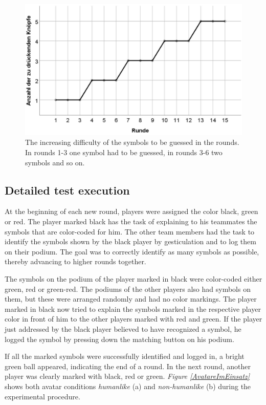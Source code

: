\documentclass[sigchi]{acmart}
\begin{document}
\begin{figure}[H]
		\begin{footnotesize}
		\centering
			\includegraphics[width=0.7\linewidth]{Abbildungen/RoundDifficulty.JPG}	
			\caption[The difficulty of the rounds]{The increasing difficulty of the symbols to be guessed in the rounds. In rounds 1-3 one symbol had to be guessed, in rounds 3-6 two symbols and so on.}
			\label{RoundDifficulty}
		\end{footnotesize}
	\end{figure}

\subsection{Detailed test execution}
At the beginning of each new round, players were assigned the color black, green or red.
The player marked black has the task of explaining to his teammates the symbols that are color-coded for him. The other team members had the task to identify the symbols shown by the black player by gesticulation and to log them on their podium. The goal was to correctly identify as many symbols as possible, thereby advancing to higher rounds together.

The symbols on the podium of the player marked in black were color-coded either green, red or green-red. The podiums of the other players also had symbols on them, but these were arranged randomly and had no color markings. The player marked in black now tried to explain the symbols marked in the respective player color in front of him to the other players marked with red and green. If the player just addressed by the black player believed to have recognized a symbol, he logged the symbol by pressing down the matching button on his podium. 

If all the marked symbols were successfully identified and logged in, a bright green ball appeared, indicating the end of a round.
In the next round, another player was clearly marked with black, red or green.
\textit{Figure \ref{AvatareImEinsatz}} shows both avatar conditions \textit{humanlike} (a) and \textit{non-humanlike} (b) during the experimental procedure.
	
\end{document}
